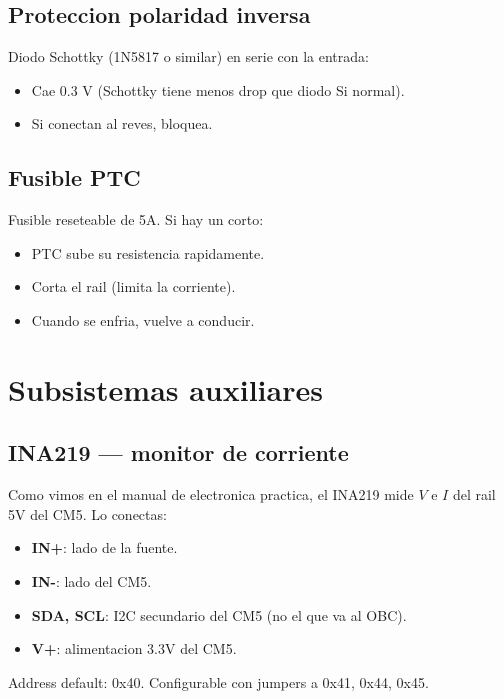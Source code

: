 \documentclass[11pt,a4paper,oneside,openright]{book}
\begin{document}
\section{Proteccion polaridad inversa}

Diodo Schottky (1N5817 o similar) en serie con la entrada:
\begin{itemize}[leftmargin=2em]
  \item Cae 0.3 V (Schottky tiene menos drop que diodo Si normal).
  \item Si conectan al reves, bloquea.
\end{itemize}

\section{Fusible PTC}

Fusible reseteable de 5A. Si hay un corto:
\begin{itemize}[leftmargin=2em]
  \item PTC sube su resistencia rapidamente.
  \item Corta el rail (limita la corriente).
  \item Cuando se enfria, vuelve a conducir.
\end{itemize}

\chapter{Subsistemas auxiliares}

\section{INA219 --- monitor de corriente}

Como vimos en el manual de electronica practica, el INA219 mide $V$ e $I$
del rail 5V del CM5. Lo conectas:

\begin{itemize}[leftmargin=2em]
  \item \textbf{IN+}: lado de la fuente.
  \item \textbf{IN-}: lado del CM5.
  \item \textbf{SDA, SCL}: I2C secundario del CM5 (no el que va al OBC).
  \item \textbf{V+}: alimentacion 3.3V del CM5.
\end{itemize}

Address default: 0x40. Configurable con jumpers a 0x41, 0x44, 0x45.
\end{document}
